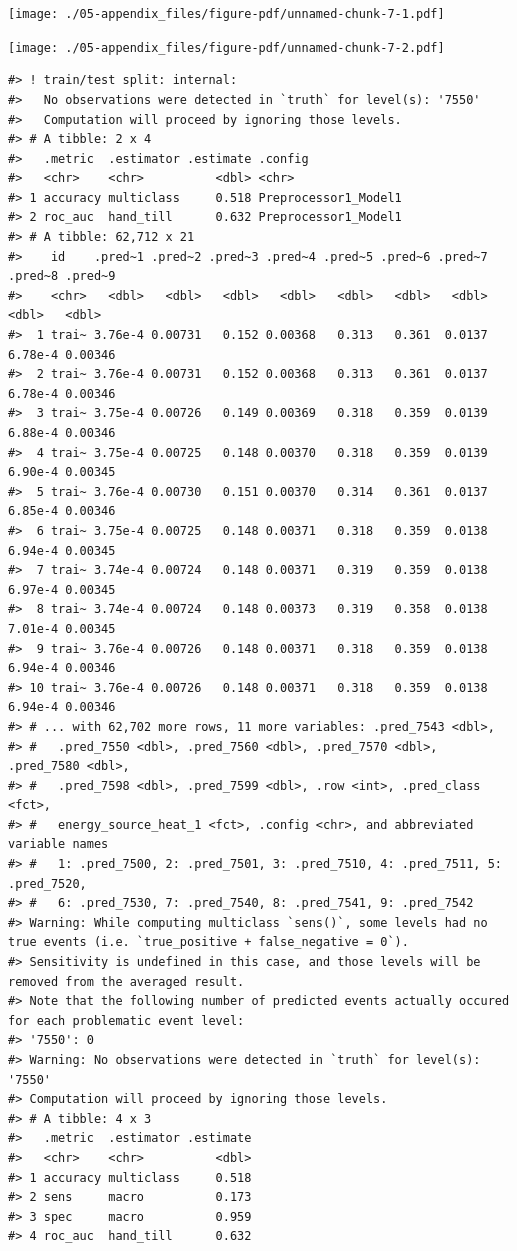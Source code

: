 \documentclass[
  letterpaper,
  DIV=11,
  numbers=noendperiod]{scrreprt}
\begin{document}
\texttt{[image: ./05-appendix\_files/figure-pdf/unnamed-chunk-7-1.pdf]}

\texttt{[image: ./05-appendix\_files/figure-pdf/unnamed-chunk-7-2.pdf]}

\begin{verbatim}
#> ! train/test split: internal:
#>   No observations were detected in `truth` for level(s): '7550'
#>   Computation will proceed by ignoring those levels.
#> # A tibble: 2 x 4
#>   .metric  .estimator .estimate .config             
#>   <chr>    <chr>          <dbl> <chr>               
#> 1 accuracy multiclass     0.518 Preprocessor1_Model1
#> 2 roc_auc  hand_till      0.632 Preprocessor1_Model1
#> # A tibble: 62,712 x 21
#>    id    .pred~1 .pred~2 .pred~3 .pred~4 .pred~5 .pred~6 .pred~7 .pred~8 .pred~9
#>    <chr>   <dbl>   <dbl>   <dbl>   <dbl>   <dbl>   <dbl>   <dbl>   <dbl>   <dbl>
#>  1 trai~ 3.76e-4 0.00731   0.152 0.00368   0.313   0.361  0.0137 6.78e-4 0.00346
#>  2 trai~ 3.76e-4 0.00731   0.152 0.00368   0.313   0.361  0.0137 6.78e-4 0.00346
#>  3 trai~ 3.75e-4 0.00726   0.149 0.00369   0.318   0.359  0.0139 6.88e-4 0.00346
#>  4 trai~ 3.75e-4 0.00725   0.148 0.00370   0.318   0.359  0.0139 6.90e-4 0.00345
#>  5 trai~ 3.76e-4 0.00730   0.151 0.00370   0.314   0.361  0.0137 6.85e-4 0.00346
#>  6 trai~ 3.75e-4 0.00725   0.148 0.00371   0.318   0.359  0.0138 6.94e-4 0.00345
#>  7 trai~ 3.74e-4 0.00724   0.148 0.00371   0.319   0.359  0.0138 6.97e-4 0.00345
#>  8 trai~ 3.74e-4 0.00724   0.148 0.00373   0.319   0.358  0.0138 7.01e-4 0.00345
#>  9 trai~ 3.76e-4 0.00726   0.148 0.00371   0.318   0.359  0.0138 6.94e-4 0.00346
#> 10 trai~ 3.76e-4 0.00726   0.148 0.00371   0.318   0.359  0.0138 6.94e-4 0.00346
#> # ... with 62,702 more rows, 11 more variables: .pred_7543 <dbl>,
#> #   .pred_7550 <dbl>, .pred_7560 <dbl>, .pred_7570 <dbl>, .pred_7580 <dbl>,
#> #   .pred_7598 <dbl>, .pred_7599 <dbl>, .row <int>, .pred_class <fct>,
#> #   energy_source_heat_1 <fct>, .config <chr>, and abbreviated variable names
#> #   1: .pred_7500, 2: .pred_7501, 3: .pred_7510, 4: .pred_7511, 5: .pred_7520,
#> #   6: .pred_7530, 7: .pred_7540, 8: .pred_7541, 9: .pred_7542
#> Warning: While computing multiclass `sens()`, some levels had no true events (i.e. `true_positive + false_negative = 0`). 
#> Sensitivity is undefined in this case, and those levels will be removed from the averaged result.
#> Note that the following number of predicted events actually occured for each problematic event level:
#> '7550': 0
#> Warning: No observations were detected in `truth` for level(s): '7550'
#> Computation will proceed by ignoring those levels.
#> # A tibble: 4 x 3
#>   .metric  .estimator .estimate
#>   <chr>    <chr>          <dbl>
#> 1 accuracy multiclass     0.518
#> 2 sens     macro          0.173
#> 3 spec     macro          0.959
#> 4 roc_auc  hand_till      0.632
\end{verbatim}
\end{document}
